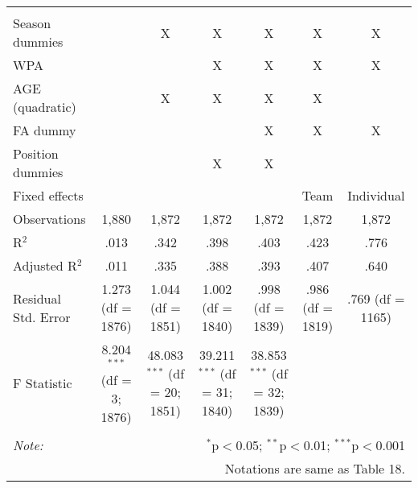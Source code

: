 \begin{table}[H]
\begin{tabular}{@{\extracolsep{5pt}}lcccccc}
  & & & & & & \\
\hline \\[-1.8ex]
Season dummies &  & X & X & X & X & X \\
WPA & & & X & X & X & X \\
AGE (quadratic) &  & X & X & X & X &  \\
FA dummy &  &  &  & X & X & X \\
Position dummies &  &  & X & X &  &  \\
Fixed effects &  &  &  &  & Team & Individual \\
Observations & 1,880 & 1,872 & 1,872 & 1,872 & 1,872 & 1,872 \\
R$^{2}$ & .013 & .342 & .398 & .403 & .423 & .776 \\
Adjusted R$^{2}$ & .011 & .335 & .388 & .393 & .407 & .640 \\
Residual Std. Error & 1.273 (df = 1876) & 1.044 (df = 1851) & 1.002 (df = 1840) & .998 (df = 1839) & .986 (df = 1819) & .769 (df = 1165) \\
F Statistic & 8.204$^{***}$ (df = 3; 1876) & 48.083$^{***}$ (df = 20; 1851) & 39.211$^{***}$ (df = 31; 1840) & 38.853$^{***}$ (df = 32; 1839) &  &  \\
\hline
\hline \\[-1.8ex]
\textit{Note:}  & \multicolumn{6}{r}{$^{*}$p$<$0.05; $^{**}$p$<$0.01; $^{***}$p$<$0.001} \\
& \multicolumn{6}{r}{Notations are same as Table 18.} \\
\end{tabular}
\end{table}
